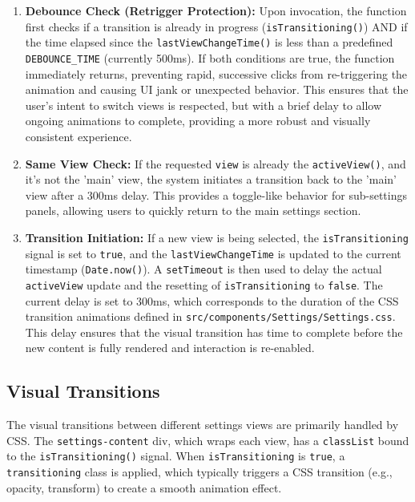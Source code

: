\documentclass[10pt]{article}
\begin{document}
\begin{enumerate}
    \item \textbf{Debounce Check (Retrigger Protection):}
    Upon invocation, the function first checks if a transition is already in progress (\texttt{isTransitioning()}) AND if the time elapsed since the \texttt{lastViewChangeTime()} is less than a predefined \texttt{DEBOUNCE\_TIME} (currently 500ms). If both conditions are true, the function immediately returns, preventing rapid, successive clicks from re-triggering the animation and causing UI jank or unexpected behavior. This ensures that the user's intent to switch views is respected, but with a brief delay to allow ongoing animations to complete, providing a more robust and visually consistent experience.

    \item \textbf{Same View Check:}
    If the requested \texttt{view} is already the \texttt{activeView()}, and it's not the 'main' view, the system initiates a transition back to the 'main' view after a 300ms delay. This provides a toggle-like behavior for sub-settings panels, allowing users to quickly return to the main settings section.

    \item \textbf{Transition Initiation:}
    If a new view is being selected, the \texttt{isTransitioning} signal is set to \texttt{true}, and the \texttt{lastViewChangeTime} is updated to the current timestamp (\texttt{Date.now()}). A \texttt{setTimeout} is then used to delay the actual \texttt{activeView} update and the resetting of \texttt{isTransitioning} to \texttt{false}. The current delay is set to 300ms, which corresponds to the duration of the CSS transition animations defined in \texttt{src/components/Settings/Settings.css}. This delay ensures that the visual transition has time to complete before the new content is fully rendered and interaction is re-enabled.
\end{enumerate}

\subsection{Visual Transitions}

The visual transitions between different settings views are primarily handled by CSS. The \texttt{settings-content} div, which wraps each view, has a \texttt{classList} bound to the \texttt{isTransitioning()} signal. When \texttt{isTransitioning} is \texttt{true}, a \texttt{transitioning} class is applied, which typically triggers a CSS transition (e.g., opacity, transform) to create a smooth animation effect.
\end{document}
